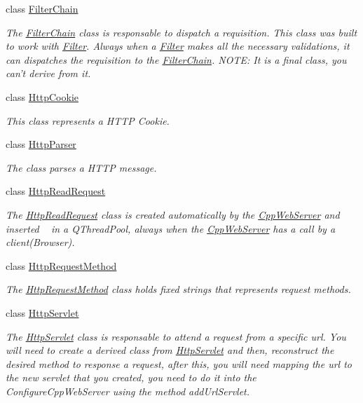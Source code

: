\begin{DoxyCompactItemize}
class \hyperlink{class_c_w_f_1_1_filter_chain}{Filter\+Chain}
\begin{DoxyCompactList}\small\item\em The \hyperlink{class_c_w_f_1_1_filter_chain}{Filter\+Chain} class is responsable to dispatch a requisition. This class was built to work with \hyperlink{class_c_w_f_1_1_filter}{Filter}. Always when a \hyperlink{class_c_w_f_1_1_filter}{Filter} makes all the necessary validations, it can dispatches the requisition to the \hyperlink{class_c_w_f_1_1_filter_chain}{Filter\+Chain}. N\+O\+T\+E\+: It is a final class, you can't derive from it. \end{DoxyCompactList}\item 
class \hyperlink{class_c_w_f_1_1_http_cookie}{Http\+Cookie}
\begin{DoxyCompactList}\small\item\em This class represents a H\+T\+T\+P Cookie. \end{DoxyCompactList}\item 
class \hyperlink{class_c_w_f_1_1_http_parser}{Http\+Parser}
\begin{DoxyCompactList}\small\item\em The class parses a H\+T\+T\+P message. \end{DoxyCompactList}\item 
class \hyperlink{class_c_w_f_1_1_http_read_request}{Http\+Read\+Request}
\begin{DoxyCompactList}\small\item\em The \hyperlink{class_c_w_f_1_1_http_read_request}{Http\+Read\+Request} class is created automatically by the \hyperlink{class_c_w_f_1_1_cpp_web_server}{Cpp\+Web\+Server} and inserted ~\newline
 in a Q\+Thread\+Pool, always when the \hyperlink{class_c_w_f_1_1_cpp_web_server}{Cpp\+Web\+Server} has a call by a client(\+Browser). \end{DoxyCompactList}\item 
class \hyperlink{class_c_w_f_1_1_http_request_method}{Http\+Request\+Method}
\begin{DoxyCompactList}\small\item\em The \hyperlink{class_c_w_f_1_1_http_request_method}{Http\+Request\+Method} class holds fixed strings that represents request methods. \end{DoxyCompactList}\item 
class \hyperlink{class_c_w_f_1_1_http_servlet}{Http\+Servlet}
\begin{DoxyCompactList}\small\item\em The \hyperlink{class_c_w_f_1_1_http_servlet}{Http\+Servlet} class is responsable to attend a request from a specific url. You will need to create a derived class from \hyperlink{class_c_w_f_1_1_http_servlet}{Http\+Servlet} and then, reconstruct the desired method to response a request, after this, you will need mapping the url to the new servlet that you created, you need to do it into the Configure\+Cpp\+Web\+Server using the method add\+Url\+Servlet. \end{DoxyCompactList}\item 

\end{DoxyCompactItemize}
